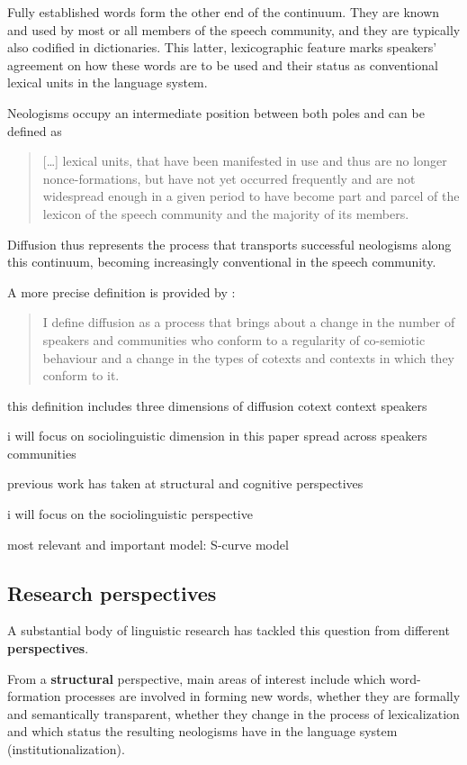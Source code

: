 \documentclass[a4paper, abstract=on]{scrartcl}
\renewcommand{\hw}[1]{\textbf{#1}}
\begin{document}
      Fully established words form the other end of the continuum. They are known and used by most or all members of the speech community, and they are typically also codified in dictionaries. This latter, lexicographic feature marks speakers' agreement on how these words are to be used and their status as conventional lexical units in the language system.

      Neologisms occupy an intermediate position between both poles and can be defined as

        \blockquote[{\cite[31]{Kerremans2015}}]{
          [\dots] lexical units, that have been manifested in use and thus are no longer nonce-formations, but have not yet occurred frequently and are not widespread enough in a given period to have become part and parcel of the lexicon of the speech community and the majority of its members.
        }

    Diffusion thus represents the process that transports successful neologisms along this continuum, becoming increasingly conventional in the speech community.

      A more precise definition is provided by \citeauthor{Schmid2020}: \blockquote[\cite{Schmid2020}]{I define diffusion as a process that brings about a change in the number of speakers and communities who conform to a regularity of co-semiotic behaviour and a change in the types of cotexts and contexts in which they conform to it.} 
      this definition includes three dimensions of diffusion
        cotext
        context
        speakers

      i will focus on sociolinguistic dimension in this paper
        spread across
          speakers
          communities

      previous work has taken at
        structural and
        cognitive perspectives

      i will focus on the sociolinguistic perspective

      most relevant and important model: S-curve model



  \subsection{Research perspectives}

    A substantial body of linguistic research has tackled this question from different \hw{perspectives}. \parencite[16]{Schmid2016}

    From a \hw{structural} perspective, main areas of interest include which word-formation processes are involved in forming new words, whether they are formally and semantically transparent, whether they change in the process of lexicalization and which status the resulting neologisms have in the language system (institutionalization). \parencite[e.g.][]{Bauer1983,Lipka2005}
\end{document}
